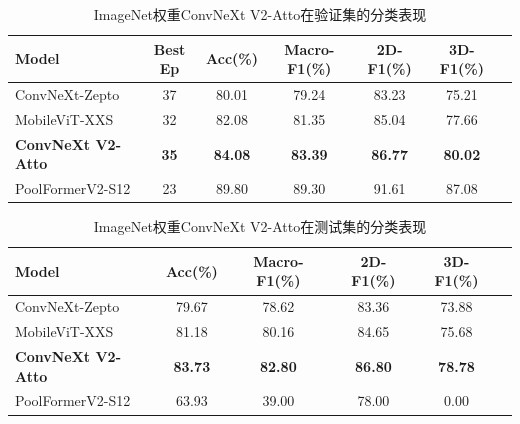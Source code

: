 \begin{table}[H]
    \centering
    \caption{ImageNet权重ConvNeXt V2-Atto在验证集的分类表现}
    \label{tab:cp2_group1_methods_imagenet_val}
    \begin{tabular}{lcccccc}
        \hline
        Model                     & Best Ep     & Acc(\%)        & Macro-F1(\%)   & 2D-F1(\%)      & 3D-F1(\%)      \\
        \hline
        ConvNeXt-Zepto            & 37          & 80.01          & 79.24          & 83.23          & 75.21          \\
        MobileViT-XXS             & 32          & 82.08          & 81.35          & 85.04          & 77.66          \\
        \textbf{ConvNeXt V2-Atto} & \textbf{35} & \textbf{84.08} & \textbf{83.39} & \textbf{86.77} & \textbf{80.02} \\
        PoolFormerV2-S12          & 23          & 89.80          & 89.30          & 91.61          & 87.08          \\
        \hline
    \end{tabular}
\end{table}

\begin{table}[H]
    \centering
    \caption{ImageNet权重ConvNeXt V2-Atto在测试集的分类表现}
    \label{tab:cp2_group1_methods_imagenet_test}
    \begin{tabular}{lccccc}
        \hline
        Model                     & Acc(\%)        & Macro-F1(\%)   & 2D-F1(\%)      & 3D-F1(\%)      \\
        \hline
        ConvNeXt-Zepto            & 79.67          & 78.62          & 83.36          & 73.88          \\
        MobileViT-XXS             & 81.18          & 80.16          & 84.65          & 75.68          \\
        \textbf{ConvNeXt V2-Atto} & \textbf{83.73} & \textbf{82.80} & \textbf{86.80} & \textbf{78.78} \\
        PoolFormerV2-S12          & 63.93          & 39.00          & 78.00          & 0.00           \\
        \hline
    \end{tabular}
\end{table}

